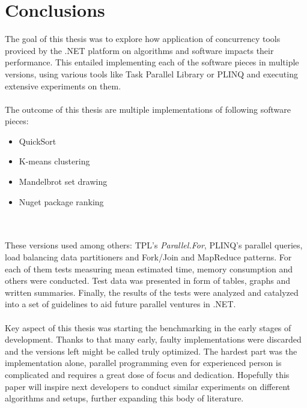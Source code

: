 \chapter{Conclusions}
The goal of this thesis was to explore how application of concurrency tools proviced by the .NET platform
on algorithms and software impacts their performance. This entailed implementing each of the software pieces
in multiple versions, using various tools like Task Parallel Library or PLINQ and executing extensive experiments on them.
\\ \\ 
The outcome of this thesis are multiple implementations of following software pieces: 
\begin{itemize}
	\item QuickSort
	\item K-means clustering
	\item Mandelbrot set drawing
	\item Nuget package ranking
\end{itemize}
\\ \\
These versions used among others: TPL's \emph{Parallel.For}, PLINQ's parallel queries, load balancing data partitioners and Fork/Join and MapReduce patterns.
For each of them tests measuring mean estimated time, memory consumption and others were conducted. 
Test data was presented in form of tables, graphs and written summaries. 
Finally, the results of the tests were analyzed and catalyzed into a set of guidelines to aid future parallel ventures in .NET. 
\\ \\ 
Key aspect of this thesis was starting the benchmarking in the early stages of development. Thanks to that many early, faulty implementations were discarded and the versions left might be called truly optimized. The hardest part was the implementation alone, parallel programming even for experienced person is complicated and requires a great dose of focus and dedication. Hopefully this paper will inspire next developers to conduct similar experiments on different algorithms and setups, further expanding this body of literature. 